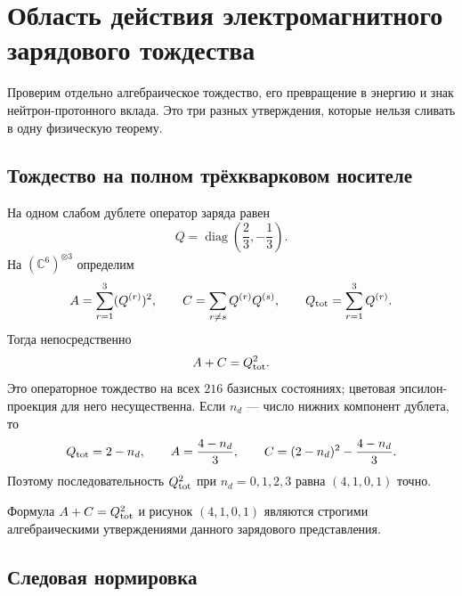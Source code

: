 \chapter{Область действия электромагнитного зарядового тождества}
\label{ch:v8-baryon-em-total-charge-identity-scope-gate}

Проверим отдельно алгебраическое тождество, его превращение в энергию и
знак нейтрон-протонного вклада. Это три разных утверждения, которые нельзя
сливать в одну физическую теорему.

\section{Тождество на полном трёхкварковом носителе}

На одном слабом дублете оператор заряда равен
\begin{equation}
 Q=\operatorname{diag}\!\left(\frac23,-\frac13\right).
 \label{eq:v8-baryon-em-one-particle-charge}
\end{equation}
На $(\mathbb C^6)^{\otimes3}$ определим
\begin{equation}
 A=\sum_{r=1}^{3}(Q^{(r)})^2,
 \qquad
 C=\sum_{r\ne s}Q^{(r)}Q^{(s)},
 \qquad
 Q_{\rm tot}=\sum_{r=1}^{3}Q^{(r)}.
 \label{eq:v8-baryon-em-self-pair-total}
\end{equation}
Тогда непосредственно
\begin{equation}
 A+C=Q_{\rm tot}^2.
 \label{eq:v8-baryon-em-total-charge-identity}
\end{equation}
Это операторное тождество на всех $216$ базисных состояниях; цветовая
эпсилон-проекция для него несущественна. Если $n_d$ --- число нижних
компонент дублета, то
\begin{equation}
 Q_{\rm tot}=2-n_d,
 \qquad
 A=\frac{4-n_d}{3},
 \qquad
 C=(2-n_d)^2-\frac{4-n_d}{3}.
 \label{eq:v8-baryon-em-epsilon-pattern}
\end{equation}
Поэтому последовательность $Q_{\rm tot}^2$ при $n_d=0,1,2,3$ равна
$(4,1,0,1)$ точно.

\begin{proposition}
Формула $A+C=Q_{\rm tot}^2$ и рисунок $(4,1,0,1)$ являются строгими
алгебраическими утверждениями данного зарядового представления.
\end{proposition}

\section{Следовая нормировка}

